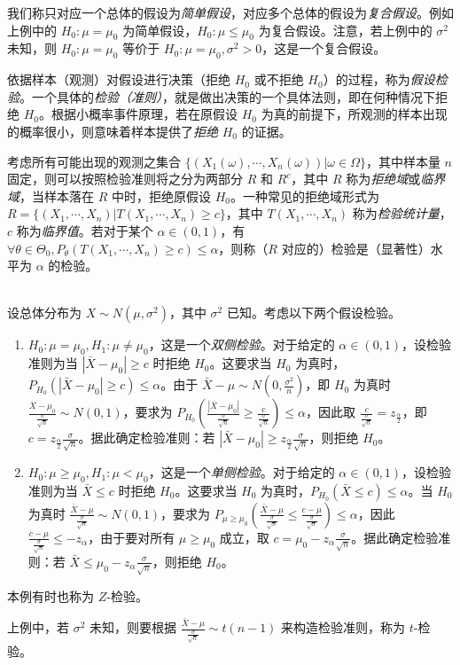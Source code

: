 \documentclass[../main.tex]{subfiles}
\begin{document}
我们称只对应一个总体的假设为\emph{简单假设}，对应多个总体的假设为\emph{复合假设}。例如上例中的 $H_0:\mu=\mu_0$ 为简单假设，$H_0:\mu\leq\mu_0$ 为复合假设。注意，若上例中的 $\sigma^2$ 未知，则 $H_0:\mu=\mu_0$ 等价于 $H_0:\mu=\mu_0,\sigma^2>0$，这是一个复合假设。

依据样本（观测）对假设进行决策（拒绝 $H_0$ 或不拒绝 $H_0$）的过程，称为\emph{假设检验}。一个具体的\emph{检验（准则）}，就是做出决策的一个具体法则，即在何种情况下拒绝 $H_0$。根据小概率事件原理，若在原假设 $H_0$ 为真的前提下，所观测的样本出现的概率很小，则意味着样本提供了\emph{拒绝} $H_0$ 的证据。

考虑所有可能出现的观测之集合 $\{(X_1(\omega),\cdots,X_n(\omega))|\omega\in\Omega\}$，其中样本量 $n$ 固定，则可以按照检验准则将之分为两部分 $R$ 和 $R^c$，其中 $R$ 称为\emph{拒绝域}或\emph{临界域}，当样本落在 $R$ 中时，拒绝原假设 $H_0$。一种常见的拒绝域形式为 $R=\{(X_1,\cdots,X_n)|T(X_1,\cdots,X_n)\geq c\}$，其中 $T(X_1,\cdots,X_n)$ 称为\emph{检验统计量}，$c$ 称为\emph{临界值}。若对于某个 $\alpha\in(0,1)$，有 $\forall\theta\in\Theta_0,P_\theta(T(X_1,\cdots,X_n)\geq c)\leq\alpha$，则称（$R$ 对应的）检验是（显著性）水平为 $\alpha$ 的检验。

\begin{example}
    \mbox{}\\
    设总体分布为 $X\sim N(\mu,\sigma^2)$，其中 $\sigma^2$ 已知。考虑以下两个假设检验。
    \begin{enumerate}
        \item $H_0:\mu=\mu_0,H_1:\mu\neq\mu_0$，这是一个\emph{双侧检验}。对于给定的 $\alpha\in(0,1)$，设检验准则为当 $|\bar X-\mu_0|\geq c$ 时拒绝 $H_0$。这要求当 $H_0$ 为真时，$P_{H_0}(|\bar X-\mu_0|\geq c)\leq\alpha$。由于 $\bar X-\mu\sim N(0,\frac{\sigma^2}n)$，即 $H_0$ 为真时 $\frac{\bar X-\mu_0}{\frac\sigma{\sqrt n}}\sim N(0,1)$，要求为 $P_{H_0}(\frac{|\bar X-\mu_0|}{\frac\sigma{\sqrt n}}\geq\frac c{\frac\sigma{\sqrt n}})\leq\alpha$，因此取 $\frac c{\frac{\sigma}{\sqrt n}}=z_{\frac\alpha 2}$，即 $c=z_{\frac\alpha 2}\frac\sigma{\sqrt n}$。据此确定检验准则：若 $|\bar X-\mu_0|\geq z_{\frac\alpha 2}\frac\sigma{\sqrt n}$，则拒绝 $H_0$。
        \item $H_0:\mu\geq\mu_0,H_1:\mu<\mu_0$，这是一个\emph{单侧检验}。对于给定的 $\alpha\in(0,1)$，设检验准则为当 $\bar X\leq c$ 时拒绝 $H_0$。这要求当 $H_0$ 为真时，$P_{H_0}(\bar X\leq c)\leq\alpha$。当 $H_0$ 为真时 $\frac{\bar X-\mu}{\frac\sigma{\sqrt n}}\sim N(0,1)$，要求为 $P_{\mu\geq\mu_0}(\frac{\bar X-\mu}{\frac\sigma{\sqrt n}}\leq\frac{c-\mu}{\frac\sigma{\sqrt n}})\leq\alpha$，因此 $\frac{c-\mu}{\frac{\sigma}{\sqrt n}}\leq-z_\alpha$，由于要对所有 $\mu\geq\mu_0$ 成立，取 $c=\mu_0-z_\alpha\frac\sigma{\sqrt n}$。据此确定检验准则：若 $\bar X\leq\mu_0-z_\alpha\frac\sigma{\sqrt n}$，则拒绝 $H_0$。
    \end{enumerate}
    本例有时也称为 $Z$-检验。
\end{example}

上例中，若 $\sigma^2$ 未知，则要根据 $\frac{\bar X-\mu}{\frac\sigma{\sqrt n}}\sim t(n-1)$ 来构造检验准则，称为 $t$-检验。
\end{document}
